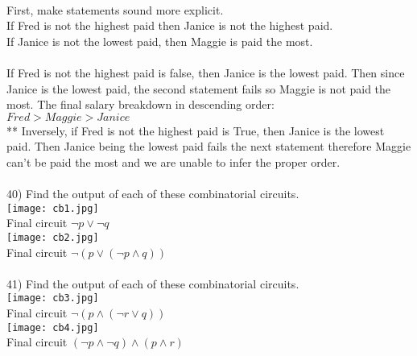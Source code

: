 \documentclass{article}
\begin{document}
\begin{flushleft}
~\\
First, make statements sound more explicit.\\
If Fred is not the highest paid then Janice is not the highest paid.\\
If Janice is not the lowest paid, then Maggie is paid the most.\\
~\\
If Fred is not the highest paid is false, then Janice is the lowest paid.  Then since Janice is the lowest paid, the second statement fails so Maggie is not paid the most.  The final salary breakdown in descending order:\\
$Fred > Maggie > Janice$\\
** Inversely, if Fred is not the highest paid is True, then Janice is the lowest paid.  Then Janice being the lowest paid fails the next statement therefore Maggie can't be paid the most and we are unable to infer the proper order.  \\
~\\
\setlength\parindent{0pt}40) Find the output of each of these combinatorial circuits.\\
\texttt{[image: cb1.jpg]} \\
\setlength\parindent{24pt}Final circuit $\neg p \lor \neg q$ \\
\setlength\parindent{0pt}\texttt{[image: cb2.jpg]} \\
\setlength\parindent{24pt}Final circuit $\neg (p \lor (\neg p \land q))$ \\
~\\
\setlength\parindent{0pt}41) Find the output of each of these combinatorial circuits.\\
\setlength\parindent{0pt}\texttt{[image: cb3.jpg]} \\
\setlength\parindent{24pt}Final circuit $\neg (p \land (\neg r \lor q))$ \\
\setlength\parindent{0pt}\texttt{[image: cb4.jpg]} \\
\setlength\parindent{24pt}Final circuit $(\neg p \land \neg q) \land (p \land r)$ \\

\end{flushleft}
\end{document}
